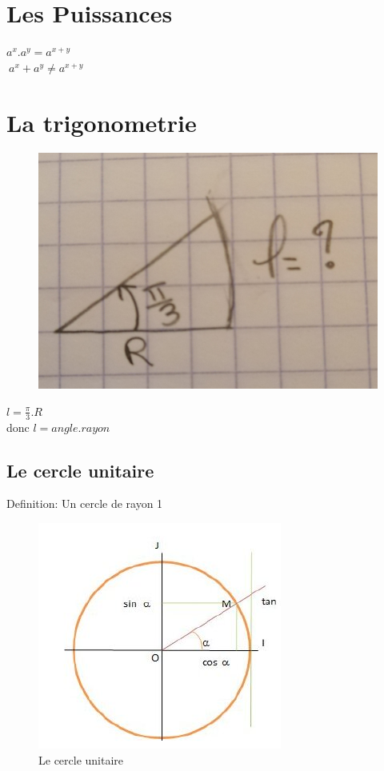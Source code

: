 \documentclass[10pt,a4paper]{article}
\begin{document}
\section{Les Puissances }
$a^x . a^y =a^{x+y}$ \\
\faExclamationCircle $\ a^x+a^y\neq a^{x+y} $\\

\section{La trigonometrie}
 \begin{figure}[h!]
 \centering
 \includegraphics[scale=0.150]{image/trigo1.jpg}
 \caption{}
 \label{fig:net}
 \end{figure}

$l=\frac{\pi}{3}.R$\\
donc $l=angle.rayon$
\subsection{Le cercle unitaire}
Definition: Un cercle de rayon 1\\
 \begin{figure}[h!]
 \centering
 \includegraphics[scale=0.50]{image/trigo2.jpg}
 \caption{Le cercle unitaire}
 \label{fig:net}
 \end{figure}
\end{document}

